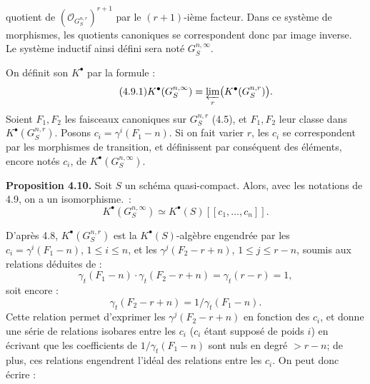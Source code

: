 quotient de \((\mathcal O_{G_S^{n,r}})^{r+1}\) par le \((r+1)\)-ième facteur. Dans ce système de morphismes, les quotients canoniques se correspondent donc par image inverse. Le système inductif ainsi défini sera noté \(G_S^{n,\infty}\).

On définit son \(K^{\bullet}\) par la formule :
\begin{equation}\tag{4.9.1}
  K^{\bullet}(G_S^{n,\infty})
  = \varprojlim_r \bigl(K^{\bullet}(G_S^{n,r})\bigr) .
\end{equation}
Soient \(F_1,F_2\) les faisceaux canoniques sur \(G_S^{n,r}\) (4.5), et \(F_1,F_2\) leur classe dans \(K^{\bullet}(G_S^{n,r})\). Posons \(c_i=\gamma^i(F_1-n)\). Si on fait varier \(r\), les \(c_i\) se correspondent par les morphismes de transition, et définissent par conséquent des éléments, encore notés \(c_i\), de \(K^{\bullet}(G_S^{n,\infty})\).

\textbf{Proposition 4.10.} Soit \(S\) un schéma quasi-compact. Alors, avec les notations de 4.9, on a un isomorphisme.~:
\[
  K^{\bullet}(G_S^{n,\infty})\simeq K^{\bullet}(S)[[c_1,\ldots,c_n]] .
\]

D'après 4.8, \(K^{\bullet}(G_S^{n,r})\) est la \(K^{\bullet}(S)\)-algèbre engendrée par les \(c_i=\gamma^i(F_1-n)\), \(1\le i\le n\), et les \(\gamma^j(F_2-r+n)\), \(1\le j\le r-n\), soumis aux relations déduites de :
\[
  \gamma_t(F_1-n)\cdot\gamma_t(F_2-r+n)
  = \gamma_t(r-r)=1,
\]
soit encore :
\[
  \gamma_t(F_2-r+n)=1/\gamma_t(F_1-n).
\]
Cette relation permet d'exprimer les \(\gamma^j(F_2-r+n)\) en fonction des \(c_i\), et donne une série de relations isobares entre les \(c_i\) (\(c_i\) étant supposé de poids \(i\)) en écrivant que les coefficients de \(1/\gamma_t(F_1-n)\) sont nuls en degré \(>r-n\); de plus, ces relations engendrent l'idéal des relations entre les \(c_i\). On peut donc écrire :
